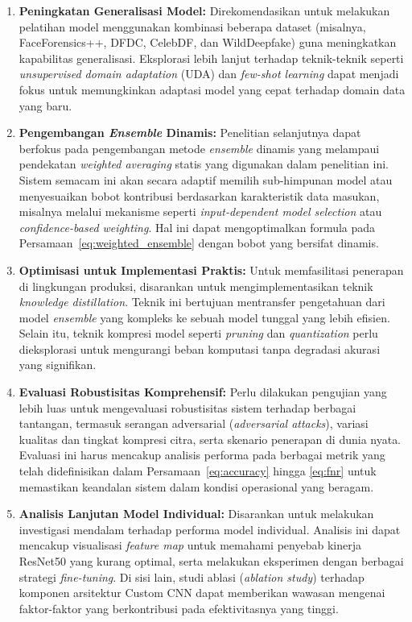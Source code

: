 \begin{enumerate}
    \item \textbf{Peningkatan Generalisasi Model:} Direkomendasikan untuk melakukan pelatihan model menggunakan kombinasi beberapa dataset (misalnya, FaceForensics++, DFDC, CelebDF, dan WildDeepfake) guna meningkatkan kapabilitas generalisasi. Eksplorasi lebih lanjut terhadap teknik-teknik seperti \textit{unsupervised domain adaptation} (UDA) dan \textit{few-shot learning} dapat menjadi fokus untuk memungkinkan adaptasi model yang cepat terhadap domain data yang baru.

    \item \textbf{Pengembangan \textit{Ensemble} Dinamis:} Penelitian selanjutnya dapat berfokus pada pengembangan metode \textit{ensemble} dinamis yang melampaui pendekatan \textit{weighted averaging} statis yang digunakan dalam penelitian ini. Sistem semacam ini akan secara adaptif memilih sub-himpunan model atau menyesuaikan bobot kontribusi berdasarkan karakteristik data masukan, misalnya melalui mekanisme seperti \textit{input-dependent model selection} atau \textit{confidence-based weighting}. Hal ini dapat mengoptimalkan formula pada Persamaan~\ref{eq:weighted_ensemble} dengan bobot yang bersifat dinamis.

    \item \textbf{Optimisasi untuk Implementasi Praktis:} Untuk memfasilitasi penerapan di lingkungan produksi, disarankan untuk mengimplementasikan teknik \textit{knowledge distillation}. Teknik ini bertujuan mentransfer pengetahuan dari model \textit{ensemble} yang kompleks ke sebuah model tunggal yang lebih efisien. Selain itu, teknik kompresi model seperti \textit{pruning} dan \textit{quantization} perlu dieksplorasi untuk mengurangi beban komputasi tanpa degradasi akurasi yang signifikan.

    \item \textbf{Evaluasi Robustisitas Komprehensif:} Perlu dilakukan pengujian yang lebih luas untuk mengevaluasi robustisitas sistem terhadap berbagai tantangan, termasuk serangan adversarial (\textit{adversarial attacks}), variasi kualitas dan tingkat kompresi citra, serta skenario penerapan di dunia nyata. Evaluasi ini harus mencakup analisis performa pada berbagai metrik yang telah didefinisikan dalam Persamaan~\ref{eq:accuracy} hingga \ref{eq:fnr} untuk memastikan keandalan sistem dalam kondisi operasional yang beragam.

    \item \textbf{Analisis Lanjutan Model Individual:} Disarankan untuk melakukan investigasi mendalam terhadap performa model individual. Analisis ini dapat mencakup visualisasi \textit{feature map} untuk memahami penyebab kinerja ResNet50 yang kurang optimal, serta melakukan eksperimen dengan berbagai strategi \textit{fine-tuning}. Di sisi lain, studi ablasi (\textit{ablation study}) terhadap komponen arsitektur Custom CNN dapat memberikan wawasan mengenai faktor-faktor yang berkontribusi pada efektivitasnya yang tinggi.


\end{enumerate}
